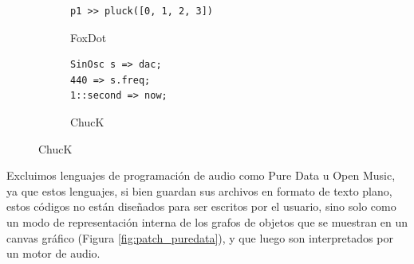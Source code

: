 \begin{figure}[H]
    \vspace{5mm} %
    
    \begin{subfigure}{.48\textwidth}
      \centering
      \begin{mdframed}
        \fontsize{9.5pt}{11pt}\selectfont
      \begin{verbatim}
p1 >> pluck([0, 1, 2, 3])
      \end{verbatim}
      \end{mdframed}
      \caption{FoxDot}
    \end{subfigure}\hfill
    \begin{subfigure}{.48\textwidth}
      \centering
      \begin{mdframed}
        \fontsize{9.5pt}{11pt}\selectfont
      \begin{verbatim}
SinOsc s => dac;
440 => s.freq;
1::second => now;
      \end{verbatim}
      \end{mdframed}
      \caption{ChucK}
    \end{subfigure}
    \source{\propio}
    \label{fig:hola_mundo}
\end{figure}

Excluimos lenguajes de programación de audio como Pure Data u Open Music, ya que estos lenguajes, si bien guardan sus archivos en formato de texto plano, estos códigos no están diseñados para ser escritos por el usuario, sino solo como un modo de representación interna de los grafos de objetos que se muestran en un canvas gráfico (Figura \ref{fig:patch_puredata}), y que luego son interpretados por un motor de audio. 

